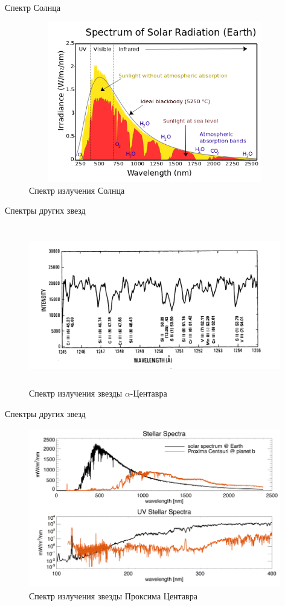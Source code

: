 \documentclass[
]{beamer}
\begin{document}
	\begin{frame}{Спектр Солнца}
		\begin{figure}[H]
			\centering
			\includegraphics[width=11cm, height=7cm]{solar.png}
			\caption{Спектр излучения Солнца}
		\end{figure}
	\end{frame}

	\begin{frame}{Спектры других звезд}
		\begin{figure}[H]
			\centering
			\includegraphics[width=11cm, height=7cm]{центавра.png}
			\caption{Спектр излучения звезды $\alpha$-Центавра}
		\end{figure}
	\end{frame}

	\begin{frame}{Спектры других звезд}
		\begin{figure}[H]
			\centering
			\includegraphics[width=11cm, height=7cm]{проксима.png}
			\caption{Спектр излучения звезды Проксима Центавра}
		\end{figure}
	\end{frame}
\end{document}

